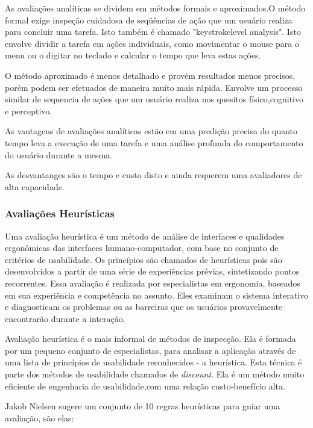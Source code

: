 As avaliações analíticas se dividem em métodos formais e aproximados.O método formal exige inspeção cuidadosa de seqüências de ação que um usuário realiza para concluir uma tarefa. Isto também é chamado "keystrokelevel analysis". Isto envolve dividir a tarefa em ações individuais, como movimentar o mouse para o menu ou o digitar no teclado e calcular o tempo que leva estas ações. 

O método aproximado é menos detalhado e provém resultados menos precisos, porém podem ser efetuados de maneira muito mais rápida. Envolve um processo similar de sequencia de ações que um usuário realiza nos quesitos físico,cognitivo e perceptivo. 

As vantagens de avaliações analíticas estão em uma predição precisa do quanto tempo leva a execução de uma tarefa e uma análise profunda do comportamento do usuário durante a mesma.

As desvantanges são o tempo e custo disto e ainda requerem uma avaliadores de alta capacidade.
\cite{andreas_holzinger}

\subsubsection{Avaliações Heurísticas}

Uma avaliação heurística é um método de análise de interfaces e qualidades ergonômicas das interfaces humano-computador, com base no conjunto de critérios de usabilidade.  Os princípios são chamados de heurísticas pois são desenvolvidos a partir de uma série de experiências prévias, sintetizando pontos recorrentes. Essa avaliação é realizada por especialistas em ergonomia, baseados em sua experiência e competência no assunto. Eles examinam o sistema interativo e diagnosticam os problemas ou as barreiras que os usuários provavelmente encontrarão durante a interação.
\cite{cybil_apostila}

Avaliação heurística é o mais informal de métodos de inspecção. Ela é formada por um pequeno conjunto de especialistas, para analisar a aplicação através de uma lista de princípios de usabilidade reconhecidos - a heurística. Esta técnica é
parte dos métodos de usabilidade chamados de \emph{discount}. Ela é um método muito eficiente de engenharia de usabilidade,com uma relação custo-benefício alta.

Jakob Nielsen sugere um conjunto de 10 regras heurísticas para guiar uma avaliação, são elas:


